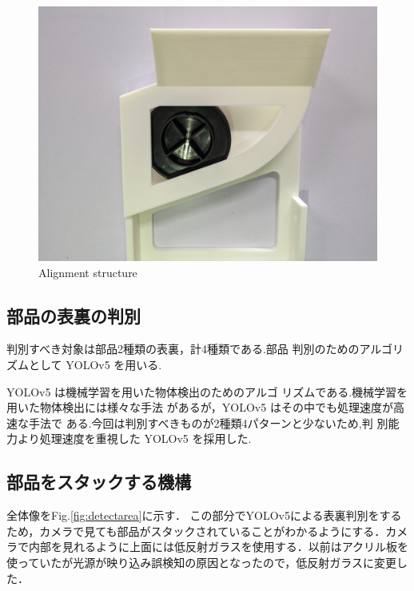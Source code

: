 \documentclass{classes/resume}
\begin{document}
\begin{figure}[tbp]
\begin{minipage}[t]{0.3\linewidth}
        \end{minipage}
        \begin{minipage}[t]{0.3\linewidth}
            \centering
            \includegraphics[width=0.9\linewidth]{figures/mukikae_syoumen_done.jpg}
        \end{minipage}
        \caption{Alignment structure}
        \label{fig:suberidai}
    \end{figure}
\subsection{部品の表裏の判別}
    判別すべき対象は部品2種類の表裏，計4種類である.部品
    判別のためのアルゴリズムとして YOLOv5\cite{ref:DBLP:journals/corr/ZhouGW17a} を用いる.

    YOLOv5 は機械学習を用いた物体検出のためのアルゴ
    リズムである.機械学習を用いた物体検出には様々な手法
    があるが，YOLOv5 はその中でも処理速度が高速な手法で
    ある.今回は判別すべきものが2種類4パターンと少ないため,判
    別能力より処理速度を重視した YOLOv5 を採用した.

\subsection{部品をスタックする機構}
    全体像をFig.\ref{fig:detectarea}に示す．
    この部分でYOLOv5による表裏判別をするため，カメラで見ても部品がスタックされていることがわかるようにする．カメラで内部を見れるように上面には低反射ガラスを使用する．以前はアクリル板を使っていたが光源が映り込み誤検知の原因となったので，低反射ガラスに変更した．
\end{document}
